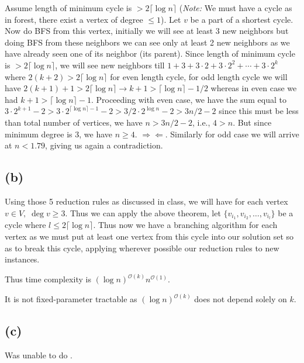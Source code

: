 \documentclass[12pt,3p]{elsarticle}
\newcommand{\contradiction}{
  \Rightarrow\!\Leftarrow
}
\begin{document}
Assume length of minimum cycle is $> 2\lceil \operatorname{log} n \rceil$ (\textit{Note: }We must have a cycle as in forest, there exist a vertex of degree $\leq 1$). Let $v$ be a part of a shortest cycle. Now do BFS from this vertex, initially we will see at least 3 new neighbors but doing BFS from these neighbors we can see only at least 2 new neighbors as we have already seen one of its neighbor (its parent). Since length of minimum cycle is $> 2\lceil \operatorname{log} n \rceil$, we will see new neighbors till $1 + 3 + 3 \cdot 2 + 3 \cdot 2^2 + \cdots + 3 \cdot 2^{k}$ where $2(k + 2) > 2 \lceil \operatorname{log} n \rceil$ for even length cycle, for odd length cycle we will have $2(k + 1) + 1 > 2 \lceil \operatorname{log} n \rceil \rightarrow k + 1 > \lceil \operatorname{log} n \rceil - 1/2$ whereas in even case we had $k + 1 > \lceil \operatorname{log} n \rceil - 1$. Proceeding with even case, we have the sum equal to $3 \cdot 2^{k + 1} - 2 > 3 \cdot 2^{\lceil \operatorname{log} n \rceil - 1} - 2 > 3/2 \cdot 2^{\operatorname{log} n} - 2 > 3n/2 - 2$ since this must be less than total number of vertices, we have $n > 3n/2 - 2$, i.e., $4 > n$. But since minimum degree is 3, we have $n \geq 4$. $\contradiction$. Similarly for odd case we will arrive at $n < 1.79$, giving us again a contradiction.

\subsection{(b)}

Using those 5 reduction rules as discussed in class, we will have for each vertex $v \in V, \; \operatorname{deg} v \geq 3$. Thus we can apply the above theorem, let $\{v_{i_1}, v_{i_2}, \dots, v_{i_l}\}$ be a cycle where $l \leq 2\lceil \operatorname{log} n \rceil$. Thus now we have a branching algorithm for each vertex as we must put at least one vertex from this cycle into our solution set so as to break this cycle, applying wherever possible our reduction rules to new instances. 

Thus time complexity is $(\operatorname{log} n)^{\mathcal{O}(k)}n^{\mathcal{O}(1)}$.

It is not fixed-parameter tractable as $(\operatorname{log} n)^{\mathcal{O}(k)}$ does not depend solely on $k$.

\subsection{(c)}

Was unable to do \Xey.
\end{document}
